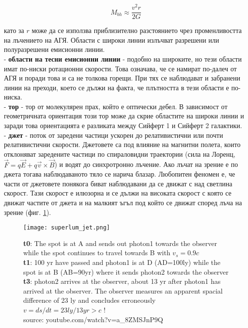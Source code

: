 \documentclass[a4paper,12pt]{article}
\begin{document}
\begin{equation}
    M_{bh} \approx \frac{v^2 r}{2G}
\end{equation}

като за $r$ може да се използва приблизително разстоянието чрез променливостта на лъчението на АГЯ. Области с широки линии излъчват разрешени или полуразрешени емисионни линии.\\

- \textbf{области на тесни емисионни линии} - подобно на широките, но тези области имат по-ниски ротационни скорости. Това означава, че се намират по-далеч от АГЯ и поради това и са не толкова горещи. При тях се наблюдават и забранени линии на преходи, което се дължи на факта, че плътността в тези области е по-ниска.\\

- \textbf{тор} - тор от молекулярен прах, който е оптически дебел. В зависимост от геометричната ориентация този тор може да скрие областите на широки линии и заради това ориентацията е разликата между Сийферт 1 и Сийферт 2 галактики.\\

- \textbf{джет} - поток от заредени частици ускорен до релативистични или почти релативистични скорости. Джетовете са под влияние на магнитни полета, които отклоняват заредените частици по спираловидни траектории (сила на Лоренц, $\Vec{F}=q\Vec{E} + q\Vec{v} \times \Vec{B}$) и водят до синхротронно лъчение. Ако лъчат на зрение е по джета тогава наблюдаваното тяло се нарича блазар. Любопитен феномен е, че части от джетовете понякога биват наблюдавани да се движат с над светлина скорост. Тази скорост е илюзорна и се дължи на високата скорост с която се движат частите от джета и на малкият ъгъл под който се движат според лъча на зрение (фиг. \ref{fig:superlum_jet}).\\

\begin{figure}[h!]
\centering
\texttt{[image: superlum\_jet.png]}
\caption{\textbf{t0}: The spot is at A and sends out photon1 towards the observer while the spot continues
to travel towards B with $v_s=0.9c$\\
\textbf{t1}: 100 yr have passed and photon1 is at D (AD=100ly) while the spot is at B
(AB=90yr) where it sends photon2 towards the observer\\
\textbf{t3}: photon2 arrives at the observer, about 13 yr after photon1 has arrived at the
observer. The observer measures an apparent spacial difference of 23 ly
and concludes erroneously $v=ds/dt=23ly/13yr>c$ !\\
source: youtube.com/watch?v=a\_8ZMSJnP9Q}
\label{fig:superlum_jet}
\end{figure}
\end{document}
